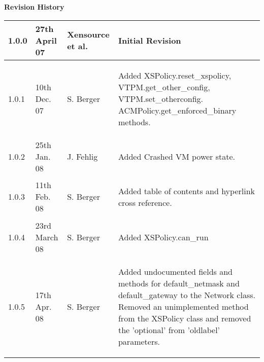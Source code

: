 { \bf Revision History}

\begin{center}
 \begin{tabular}{|l|l|l|l|}
  \hline
  1.0.0 & 27th April 07 & Xensource et al. &
   \begin{minipage}[t][.7cm]{7cm}
     Initial Revision
   \end{minipage}\\
  \hline
  1.0.1 & 10th Dec. 07 & S. Berger &
   \begin{minipage}[t]{7cm}
    \begin{flushleft}
     Added XSPolicy.reset\_xspolicy, VTPM.get\_other\_config,
     VTPM.set\_otherconfig. ACMPolicy.get\_enforced\_binary methods.
    \end{flushleft}
   \end{minipage}\\
  \hline
  1.0.2 & 25th Jan. 08 & J. Fehlig &
   \begin{minipage}[t]{7cm}
    \begin{flushleft}
     Added Crashed VM power state.
    \end{flushleft}
   \end{minipage}\\
  \hline
  1.0.3 & 11th Feb. 08 & S. Berger &
   \begin{minipage}[t]{7cm}
    \begin{flushleft}
     Added table of contents and hyperlink cross reference.
    \end{flushleft}
   \end{minipage}\\
  \hline
  1.0.4 & 23rd March 08 & S. Berger &
   \begin{minipage}[t]{7cm}
    \begin{flushleft}
     Added XSPolicy.can\_run
    \end{flushleft}
   \end{minipage}\\
  \hline
  1.0.5 & 17th Apr. 08 & S. Berger &
   \begin{minipage}[t]{7cm}
    \begin{flushleft}
     Added undocumented fields and methods for default\_netmask and
     default\_gateway to the Network class. Removed an unimplemented
     method from the XSPolicy class and removed the 'optional' from
     'oldlabel' parameters.
    \end{flushleft}
   \end{minipage}\\

\end{tabular}
\end{center}
